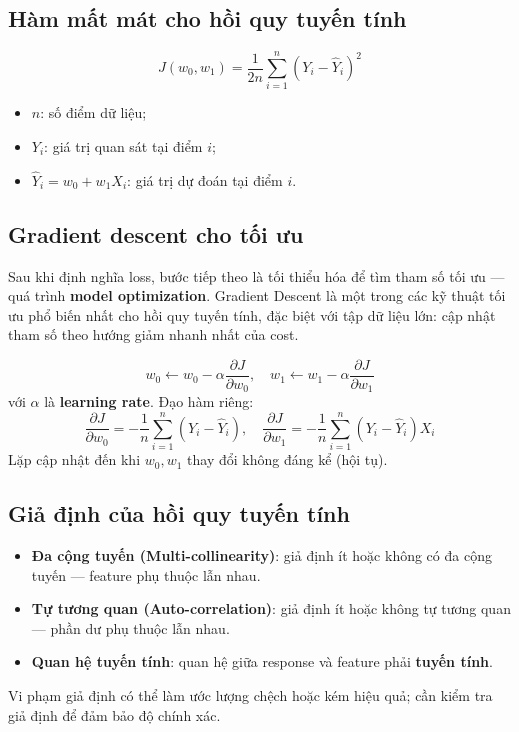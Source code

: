 \subsection{Hàm mất mát cho hồi quy tuyến tính}

\begin{dinhnghia}[title={Mean Squared Error (MSE) --- phổ biến nhất}]
\[
J(w_0, w_1) = \frac{1}{2n} \sum_{i=1}^{n} \left( Y_i - \hat{Y}_i \right)^2
\]
\begin{itemize}
  \item $n$: số điểm dữ liệu;
  \item $Y_i$: giá trị quan sát tại điểm $i$;
  \item $\hat{Y}_i = w_0 + w_1 X_i$: giá trị dự đoán tại điểm $i$.
\end{itemize}
\end{dinhnghia}

\subsection{Gradient descent cho tối ưu}

\begin{phuongphap}[title={Tối ưu mô hình}]
Sau khi định nghĩa loss, bước tiếp theo là tối thiểu hóa để tìm tham số tối ưu --- quá trình \textbf{model optimization}.
Gradient Descent là một trong các kỹ thuật tối ưu phổ biến nhất cho hồi quy tuyến tính, đặc biệt với tập dữ liệu lớn: cập nhật tham số theo hướng giảm nhanh nhất của cost.
\end{phuongphap}

\begin{phuongphap}[title={Cập nhật tham số}]
\[
w_0 \leftarrow w_0 - \alpha \frac{\partial J}{\partial w_0},
\quad
w_1 \leftarrow w_1 - \alpha \frac{\partial J}{\partial w_1}
\]
với $\alpha$ là \textbf{learning rate}. Đạo hàm riêng:
\[
\frac{\partial J}{\partial w_0} = -\frac{1}{n} \sum_{i=1}^{n} \left( Y_i - \hat{Y}_i \right),
\quad
\frac{\partial J}{\partial w_1} = -\frac{1}{n} \sum_{i=1}^{n} \left( Y_i - \hat{Y}_i \right) X_i
\]
Lặp cập nhật đến khi $w_0, w_1$ thay đổi không đáng kể (hội tụ).
\end{phuongphap}

\subsection{Giả định của hồi quy tuyến tính}

\begin{luuy}[title={Giả định mô hình}]
\begin{itemize}
  \item \textbf{Đa cộng tuyến (Multi-collinearity)}: giả định ít hoặc không có đa cộng tuyến --- feature phụ thuộc lẫn nhau.
  \item \textbf{Tự tương quan (Auto-correlation)}: giả định ít hoặc không tự tương quan --- phần dư phụ thuộc lẫn nhau.
  \item \textbf{Quan hệ tuyến tính}: quan hệ giữa response và feature phải \textbf{tuyến tính}.
\end{itemize}
Vi phạm giả định có thể làm ước lượng chệch hoặc kém hiệu quả; cần kiểm tra giả định để đảm bảo độ chính xác.
\end{luuy}


